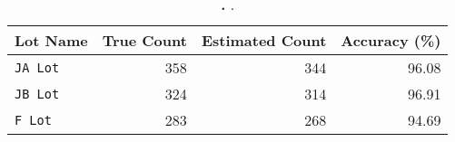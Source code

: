 \begin{table}[t]
\begin{threeparttable}
{\small
\begin{tabularx}{\columnwidth}{Xrrr}
{\normalsize{\textbf{Lot Name}}} & 
{\normalsize{\textbf{True Count}}} & 
{\normalsize{\textbf{Estimated Count}}} &
{\normalsize{\textbf{Accuracy (\%)}}} \\
\toprule
\texttt{JA Lot} & \num{358} & \num{344} & 96.08 \\
\texttt{JB Lot} & \num{324} & \num{314} & 96.91 \\
\texttt{F Lot} & \num{283} & \num{268} & 94.69 \\
\end{tabularx}
}
\caption{\textbf{.} .}
\label{table-capacity}
\end{threeparttable}
\end{table}

